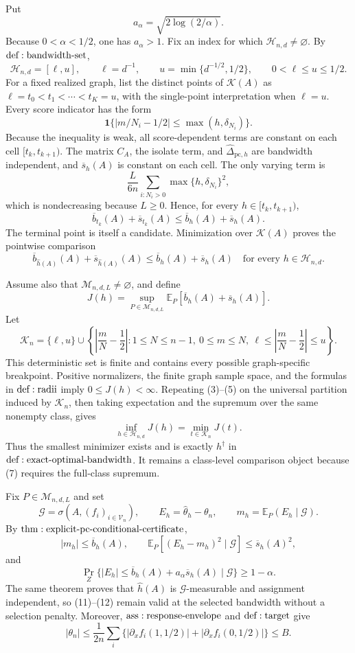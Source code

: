 Put
\[
 a_\alpha=\sqrt{2\log(2/\alpha)}.
\tag{1}
\]
Because \(0<\alpha<1/2\), one has \(a_\alpha>1\).  Fix an index for which \(\mathcal H_{n,d}\ne\varnothing\).  By \({\rm def:bandwidth\text{-}set}\),
\[
 \mathcal H_{n,d}=[\ell,u],\qquad
 \ell=d^{-1},\qquad u=\min\{d^{-1/2},1/2\},
 \qquad0<\ell\leq u\leq1/2.
\tag{2}
\]
For a fixed realized graph, list the distinct points of \(\mathcal K(A)\) as \(\ell=t_0<t_1<\cdots<t_K=u\), with the single-point interpretation when \(\ell=u\).  Every score indicator has the form
\[
 \mathbf1\{|m/N_i-1/2|\leq\max(h,\delta_{N_i})\}.
\tag{3}
\]
Because the inequality is weak, all score-dependent terms are constant on each cell \([t_k,t_{k+1})\).  The matrix \(C_A\), the isolate term, and \(\widehat\Delta_{\mathrm{pc},h}\) are bandwidth independent, and \(\overline s_h(A)\) is constant on each cell.  The only varying term is
\[
 \frac{L}{6n}\sum_{i:N_i>0}\max\{h,\delta_{N_i}\}^2,
\tag{4}
\]
which is nondecreasing because \(L\geq0\).  Hence, for every \(h\in[t_k,t_{k+1})\),
\[
 \overline b_{t_k}(A)+\overline s_{t_k}(A)
 \leq\overline b_h(A)+\overline s_h(A).
\tag{5}
\]
The terminal point is itself a candidate.  Minimization over \(\mathcal K(A)\) proves the pointwise comparison
\[
 \overline b_{\widehat h(A)}(A)+\overline s_{\widehat h(A)}(A)
 \leq\overline b_h(A)+\overline s_h(A)
 \quad\text{for every }h\in\mathcal H_{n,d}.
\tag{6}
\]

Assume also that \(\mathcal M_{n,d,L}\ne\varnothing\), and define
\[
 J(h)=\sup_{P\in\mathcal M_{n,d,L}}
 \mathbb E_P[\overline b_h(A)+\overline s_h(A)].
\tag{7}
\]
Let
\[
 \mathcal K_n=\{\ell,u\}\cup
 \left\{\left|\frac mN-\frac12\right|:
 1\leq N\leq n-1,\ 0\leq m\leq N,\
 \ell\leq\left|\frac mN-\frac12\right|\leq u\right\}.
\tag{8}
\]
This deterministic set is finite and contains every possible graph-specific breakpoint.  Positive normalizers, the finite graph sample space, and the formulas in \({\rm def:radii}\) imply \(0\leq J(h)<\infty\).  Repeating (3)--(5) on the universal partition induced by \(\mathcal K_n\), then taking expectation and the supremum over the same nonempty class, gives
\[
 \inf_{h\in\mathcal H_{n,d}}J(h)=\min_{t\in\mathcal K_n}J(t).
\tag{9}
\]
Thus the smallest minimizer exists and is exactly \(h^\dagger\) in \({\rm def:exact\text{-}optimal\text{-}bandwidth}\).  It remains a class-level comparison object because (7) requires the full-class supremum.

Fix \(P\in\mathcal M_{n,d,L}\) and set
\[
 \mathcal G=\sigma\!\left(A,(f_i)_{i\in\mathcal V_n}\right),
 \qquad E_h=\widehat\theta_h-\theta_n,
 \qquad m_h=\mathbb E_P(E_h\mid\mathcal G).
\tag{10}
\]
By \({\rm thm:explicit\text{-}pc\text{-}conditional\text{-}certificate}\),
\[
 |m_h|\leq\overline b_h(A),
 \qquad
 \mathbb E_P[(E_h-m_h)^2\mid\mathcal G]\leq\overline s_h(A)^2,
\tag{11}
\]
and
\[
 \Pr_Z\{|E_h|\leq\overline b_h(A)+a_\alpha\overline s_h(A)\mid\mathcal G\}
 \geq1-\alpha.
\tag{12}
\]
The same theorem proves that \(\widehat h(A)\) is \(\mathcal G\)-measurable and assignment independent, so (11)--(12) remain valid at the selected bandwidth without a selection penalty.  Moreover, \({\rm ass:response\text{-}envelope}\) and \({\rm def:target}\) give
\[
 |\theta_n|\leq\frac1{2n}\sum_i
 \{|\partial_xf_i(1,1/2)|+|\partial_xf_i(0,1/2)|\}
 \leq B.
\tag{13}
\]

